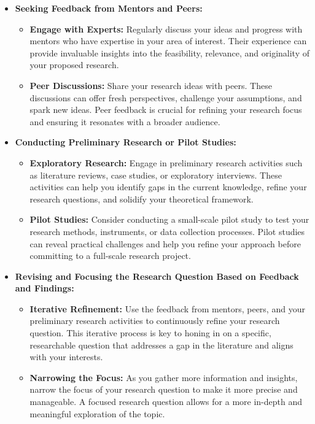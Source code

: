 \documentclass[
]{book}
\providecommand{\tightlist}{%
  \setlength{\itemsep}{0pt}\setlength{\parskip}{0pt}}
\begin{document}
\begin{itemize}
\tightlist
\item
  \textbf{Seeking Feedback from Mentors and Peers:}

  \begin{itemize}
  \tightlist
  \item
    \textbf{Engage with Experts:} Regularly discuss your ideas and progress with mentors who have expertise in your area of interest. Their experience can provide invaluable insights into the feasibility, relevance, and originality of your proposed research.
  \item
    \textbf{Peer Discussions:} Share your research ideas with peers. These discussions can offer fresh perspectives, challenge your assumptions, and spark new ideas. Peer feedback is crucial for refining your research focus and ensuring it resonates with a broader audience.
  \end{itemize}
\item
  \textbf{Conducting Preliminary Research or Pilot Studies:}

  \begin{itemize}
  \tightlist
  \item
    \textbf{Exploratory Research:} Engage in preliminary research activities such as literature reviews, case studies, or exploratory interviews. These activities can help you identify gaps in the current knowledge, refine your research questions, and solidify your theoretical framework.
  \item
    \textbf{Pilot Studies:} Consider conducting a small-scale pilot study to test your research methods, instruments, or data collection processes. Pilot studies can reveal practical challenges and help you refine your approach before committing to a full-scale research project.
  \end{itemize}
\item
  \textbf{Revising and Focusing the Research Question Based on Feedback and Findings:}

  \begin{itemize}
  \tightlist
  \item
    \textbf{Iterative Refinement:} Use the feedback from mentors, peers, and your preliminary research activities to continuously refine your research question. This iterative process is key to honing in on a specific, researchable question that addresses a gap in the literature and aligns with your interests.
  \item
    \textbf{Narrowing the Focus:} As you gather more information and insights, narrow the focus of your research question to make it more precise and manageable. A focused research question allows for a more in-depth and meaningful exploration of the topic.
  \end{itemize}
\end{itemize}
\end{document}
